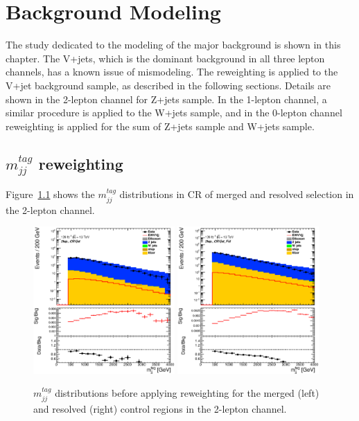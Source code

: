 \chapter{Background Modeling}
\label{chap:modeling}

The study dedicated to the modeling of the major background is shown in this chapter.
The V+jets, which is the dominant background in all three lepton channels, has a known issue of mismodeling. 
The reweighting is applied to the V+jet background sample, as described in the following sections.
Details are shown in the 2-lepton channel for Z+jets sample. 
In the 1-lepton channel, a similar procedure is applied to the W+jets sample, and in the 0-lepton channel reweighting is applied for the sum of Z+jets sample and W+jets sample.

\section{$m_{jj}^{tag}$ reweighting}
Figure~\ref{fig:2lep_mtag_before_rw} shows the $m^{tag}_{jj}$ distributions in CR of merged and resolved selection in the 2-lepton channel.

\begin{figure}[ht]
    \centering
    \includegraphics[width=0.48\textwidth]{figures/2lep/reweighting/before_reweighting/C_0ptag1pfat0pjet_0ptv_CRVjet_MTagMerJets_Log.eps}
    \includegraphics[width=0.48\textwidth]{figures/2lep/reweighting/before_reweighting/C_0ptag2pjet_0ptv_CRVjet_Fid_MTagResJets_Log.eps}
    \caption{ $m^{tag}_{jj}$ distributions before applying reweighting for the merged (left) and resolved (right) control regions in the 2-lepton channel.}
    \label{fig:2lep_mtag_before_rw}
\end{figure}

